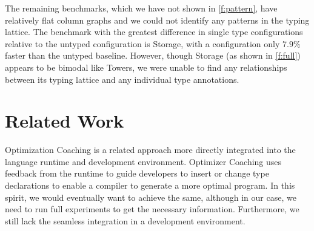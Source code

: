\documentclass[sigplan,10pt,review,screen]{acmart}\settopmatter{printfolios=true}
\begin{document}
The remaining benchmarks, which we have not shown in \ref{f:pattern}, have relatively flat column graphs and we could not identify any patterns in the typing lattice. The benchmark with the greatest difference in single type configurations relative to the untyped configuration is Storage, with a configuration only $7.9\%$ faster than the untyped baseline. However, though Storage (as shown in \ref{f:full}) appears to be bimodal like Towers, we were unable to find any relationships between its typing lattice and any individual type annotations.


\section{Related Work}
\label{s-rel}

Optimization Coaching
\citep{St-Amour:2012:OCO} is a related approach more
directly integrated into the language runtime and development environment.
Optimizer Coaching uses feedback from the runtime to guide developers
to insert or change type declarations 
to enable a compiler to generate a more optimal program.
In this spirit, we would eventually want to achieve the same, although
in our case,
we need to run full experiments to get the necessary information.
Furthermore, we still lack the seamless integration in a development environment.
\end{document}
